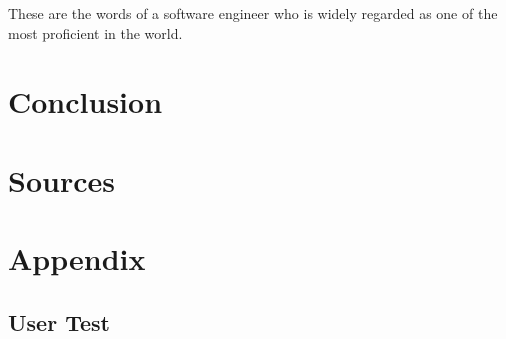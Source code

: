 \documentclass[../main.tex]{subfiles}
\begin{document}
These are the words of a software engineer who is  widely regarded as one of the most proficient in the world.


\section{Conclusion}


\section{Sources}

\section{Appendix}
\label{sec:appendix}

\subsection{User Test}
\label{sec:user_test}
\end{document}
